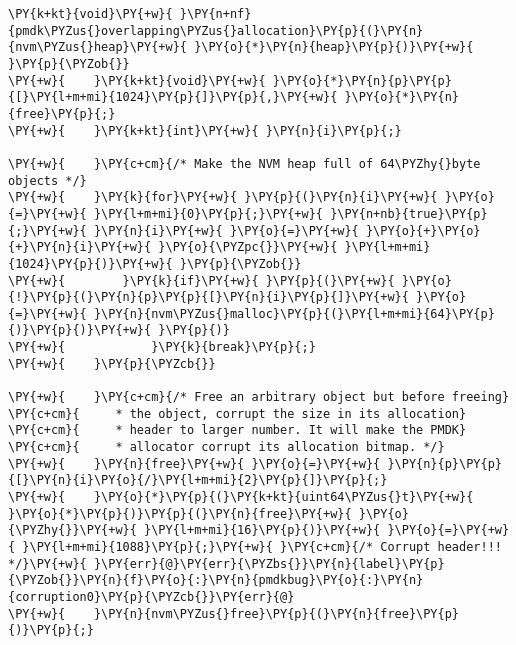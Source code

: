\begin{Verbatim}[commandchars=\\\{\},codes={\catcode`\$=3\catcode`\^=7\catcode`\_=8\relax}]
\PY{k+kt}{void}\PY{+w}{ }\PY{n+nf}{pmdk\PYZus{}overlapping\PYZus{}allocation}\PY{p}{(}\PY{n}{nvm\PYZus{}heap}\PY{+w}{ }\PY{o}{*}\PY{n}{heap}\PY{p}{)}\PY{+w}{ }\PY{p}{\PYZob{}}
\PY{+w}{    }\PY{k+kt}{void}\PY{+w}{ }\PY{o}{*}\PY{n}{p}\PY{p}{[}\PY{l+m+mi}{1024}\PY{p}{]}\PY{p}{,}\PY{+w}{ }\PY{o}{*}\PY{n}{free}\PY{p}{;}
\PY{+w}{    }\PY{k+kt}{int}\PY{+w}{ }\PY{n}{i}\PY{p}{;}

\PY{+w}{    }\PY{c+cm}{/* Make the NVM heap full of 64\PYZhy{}byte objects */}
\PY{+w}{    }\PY{k}{for}\PY{+w}{ }\PY{p}{(}\PY{n}{i}\PY{+w}{ }\PY{o}{=}\PY{+w}{ }\PY{l+m+mi}{0}\PY{p}{;}\PY{+w}{ }\PY{n+nb}{true}\PY{p}{;}\PY{+w}{ }\PY{n}{i}\PY{+w}{ }\PY{o}{=}\PY{+w}{ }\PY{o}{+}\PY{o}{+}\PY{n}{i}\PY{+w}{ }\PY{o}{\PYZpc{}}\PY{+w}{ }\PY{l+m+mi}{1024}\PY{p}{)}\PY{+w}{ }\PY{p}{\PYZob{}}
\PY{+w}{        }\PY{k}{if}\PY{+w}{ }\PY{p}{(}\PY{+w}{ }\PY{o}{!}\PY{p}{(}\PY{n}{p}\PY{p}{[}\PY{n}{i}\PY{p}{]}\PY{+w}{ }\PY{o}{=}\PY{+w}{ }\PY{n}{nvm\PYZus{}malloc}\PY{p}{(}\PY{l+m+mi}{64}\PY{p}{)}\PY{p}{)}\PY{+w}{ }\PY{p}{)}
\PY{+w}{            }\PY{k}{break}\PY{p}{;}
\PY{+w}{    }\PY{p}{\PYZcb{}}

\PY{+w}{    }\PY{c+cm}{/* Free an arbitrary object but before freeing}
\PY{c+cm}{     * the object, corrupt the size in its allocation}
\PY{c+cm}{     * header to larger number. It will make the PMDK}
\PY{c+cm}{     * allocator corrupt its allocation bitmap. */}
\PY{+w}{    }\PY{n}{free}\PY{+w}{ }\PY{o}{=}\PY{+w}{ }\PY{n}{p}\PY{p}{[}\PY{n}{i}\PY{o}{/}\PY{l+m+mi}{2}\PY{p}{]}\PY{p}{;}
\PY{+w}{    }\PY{o}{*}\PY{p}{(}\PY{k+kt}{uint64\PYZus{}t}\PY{+w}{ }\PY{o}{*}\PY{p}{)}\PY{p}{(}\PY{n}{free}\PY{+w}{ }\PY{o}{\PYZhy{}}\PY{+w}{ }\PY{l+m+mi}{16}\PY{p}{)}\PY{+w}{ }\PY{o}{=}\PY{+w}{ }\PY{l+m+mi}{1088}\PY{p}{;}\PY{+w}{ }\PY{c+cm}{/* Corrupt header!!! */}\PY{+w}{ }\PY{err}{@}\PY{err}{\PYZbs{}}\PY{n}{label}\PY{p}{\PYZob{}}\PY{n}{f}\PY{o}{:}\PY{n}{pmdkbug}\PY{o}{:}\PY{n}{corruption0}\PY{p}{\PYZcb{}}\PY{err}{@}
\PY{+w}{    }\PY{n}{nvm\PYZus{}free}\PY{p}{(}\PY{n}{free}\PY{p}{)}\PY{p}{;}


\end{Verbatim}
